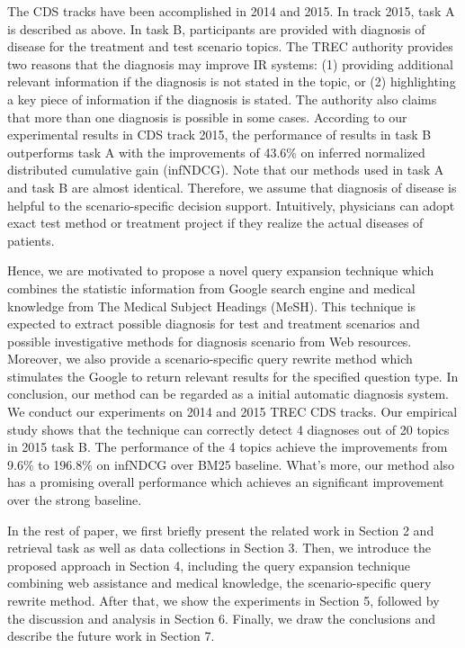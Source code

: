 \documentclass{IEEEtran}
\begin{document}
The CDS tracks have been accomplished in 2014 and 2015. In track 2015, task A is described as above. In task B, participants are provided with diagnosis of disease for the treatment and test scenario topics. The TREC authority provides two reasons that the diagnosis may improve IR systems: (1) providing additional relevant information if the diagnosis is not stated in the topic, or (2) highlighting a key piece of information if the diagnosis is stated. The authority also claims that more than one diagnosis is possible in some cases. According to our experimental results in CDS track 2015, the performance of results in task B outperforms task A with the improvements of 43.6\% on inferred normalized distributed cumulative gain (infNDCG). Note that our methods used in task A and task B are almost identical. Therefore, we assume that diagnosis of disease is helpful to the scenario-specific decision support. Intuitively, physicians can adopt exact test method or treatment project if they realize the actual diseases of patients.

Hence, we are motivated to propose a novel query expansion technique which combines the statistic information from Google search engine and medical knowledge from The Medical Subject Headings (MeSH). This technique is expected to extract possible diagnosis for test and treatment scenarios and possible investigative methods for diagnosis scenario from Web resources. Moreover, we also provide a scenario-specific query rewrite method which stimulates the Google to return relevant results for the specified question type. In conclusion, our method can be regarded as a initial automatic diagnosis system. We conduct our experiments on 2014 and 2015 TREC CDS tracks. Our empirical study shows that the technique can correctly detect 4 diagnoses out of 20 topics in 2015 task B. The performance of the 4 topics achieve the improvements from 9.6\% to 196.8\% on infNDCG over BM25 \cite{robertson2009probabilistic} baseline. What's more, our method also has a promising overall performance which achieves an significant improvement over the strong baseline.

In the rest of paper, we first briefly present the related work in Section 2 and retrieval task as well as data collections in Section 3. Then, we introduce the proposed approach in Section 4, including the query expansion technique combining web assistance and medical knowledge, the scenario-specific query rewrite method. After that, we show the experiments in Section 5, followed by the discussion and analysis in Section 6. Finally, we draw the conclusions and describe the future work in Section 7.
\end{document}
